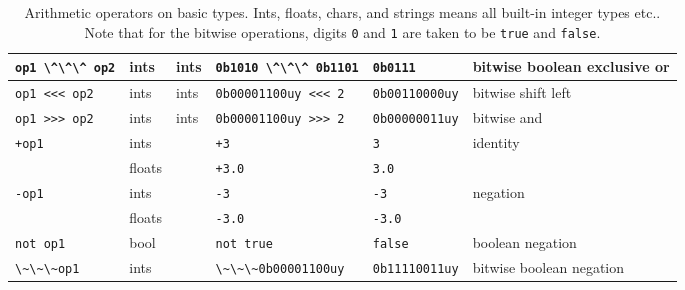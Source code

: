 \begin{table}
\begin{tabularx}{\linewidth}{|l|l|l|l|l|X|}
    \hline
    \lstinline!op1 \^\^\^ op2!&ints & ints & \lstinline!0b1010 \^\^\^ 0b1101!&\lstinline!0b0111!&bitwise boolean exclusive or\\
    \hline
     \lstinline!op1 <<< op2!&ints & ints & \lstinline!0b00001100uy <<< 2!&\lstinline!0b00110000uy!&bitwise shift left\\
     \hline
     \lstinline!op1 >>> op2!&ints & ints & \lstinline!0b00001100uy >>> 2!&\lstinline!0b00000011uy!&bitwise and\\
     \hline
    \lstinline!+op1!&ints&&\lstinline!+3!&\lstinline!3!&identity\\
             &floats&&\lstinline!+3.0!&\lstinline!3.0!&\\
    \hline
    \lstinline!-op1!&ints&&\lstinline!-3!&\lstinline!-3!&negation\\
             &floats&&\lstinline!-3.0!&\lstinline!-3.0!&\\
    \hline
    \lstinline!not op1!&bool&&\lstinline!not true!&\lstinline!false!&boolean negation\\
    \hline
    \lstinline!\~\~\~op1!&ints&&\lstinline!\~\~\~0b00001100uy!&\lstinline!0b11110011uy!&bitwise boolean negation\\
    \hline
  \end{tabularx}
  \caption{Arithmetic operators on basic types. Ints, floats, chars, and strings means all built-in integer types etc.. Note that for the bitwise operations, digits \lstinline{0} and \lstinline{1} are taken to be \lstinline{true} and \lstinline{false}.}
  \label{tab:preNInfixOperators}
\end{table}
